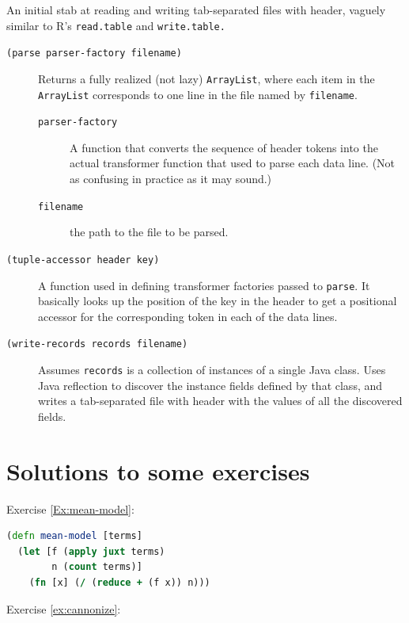 \documentclass[11pt,openany,american,usenames,dvipsnames,svgnames,x11names,table,isodate]{article}
\numberwithin{equation}{section}
\numberwithin{figure}{section}
\begin{document}
An initial stab at reading and writing tab-separated files with header,
vaguely similar to R's \texttt{read.table} and \texttt{write.table.}
\begin{description}
\item [{\texttt{(parse~parser-factory~filename)}}] Returns a fully realized
(not lazy) \texttt{ArrayList}, where each item in the \texttt{ArrayList}
corresponds to one line in the file named by \texttt{filename}.

\begin{description}
\item [{\texttt{parser-factory}}] A function that converts the sequence
of header tokens into the actual transformer function that used to
parse each data line. (Not as confusing in practice as it may sound.)
\item [{\texttt{filename}}] the path to the file to be parsed.
\end{description}
\item [{\texttt{(tuple-accessor~header~key)}}] A function used in defining
transformer factories passed to \texttt{parse}. It basically looks
up the position of the key in the header to get a positional accessor
for the corresponding token in each of the data lines.
\item [{\texttt{(write-records~records~filename)}}] Assumes \texttt{records}
is a collection of instances of a single Java class. Uses Java reflection
to discover the instance fields defined by that class, and writes
a tab-separated file with header with the values of all the discovered
fields.
\end{description}
\newpage{}


\section{Solutions to some exercises}

Exercise \ref{Ex:mean-model}:

\begin{minipage}[t]{1\columnwidth}%
\begin{lstlisting}[caption={Mean additive model},label={lis:mean-model},language=clojure,tabsize=2]
(defn mean-model [terms] 
  (let [f (apply juxt terms)
        n (count terms)]
    (fn [x] (/ (reduce + (f x)) n)))
\end{lstlisting}
%
\end{minipage}

Exercise \ref{ex:cannonize}:
\end{document}
